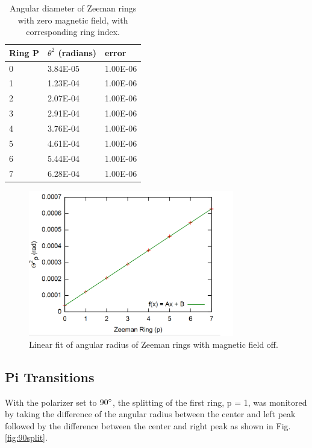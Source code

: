 \documentclass[12pt]{article}
\begin{document}
\begin{table}[h!]\centering
\begin{tabular}{ |p{1.5cm}|p{2.5cm}|p{2.5cm}|}
 \hline
  Ring P & $\theta^2$ (radians) & error \\
 \hline
 0 &  3.84E-05 & 1.00E-06\\
 \hline
 1 &  1.23E-04 & 1.00E-06\\
 \hline
 2 &  2.07E-04 & 1.00E-06\\
 \hline
 3 &  2.91E-04 & 1.00E-06\\
 \hline
 4 &  3.76E-04& 1.00E-06\\
 \hline
 5 &  4.61E-04 & 1.00E-06\\
 \hline
 6 &  5.44E-04 & 1.00E-06\\
 \hline
 7 &  6.28E-04 & 1.00E-06\\
 \hline
\end{tabular}
\def\sym#1{\ifmmode^{#1}\else\(^{#1}\)\fi}
\caption{Angular diameter of Zeeman rings with zero magnetic field, with corresponding ring index.}
\label{tab:linearset}
\end{table}

\begin{figure}[h!]\centering
 \quad \includegraphics[width=0.8\textwidth]{zring}
\caption{Linear fit of angular radius of Zeeman rings with magnetic field off. }
\label{fig:zring}
\end{figure}

\newpage
\subsection{Pi Transitions}
With the polarizer set to $90\degree$, the splitting of the first ring, p = 1, was monitored by taking the difference of the angular radius between the center and left peak followed by the difference between the center and right peak as shown in Fig.\ref{fig:90split}.
\end{document}
